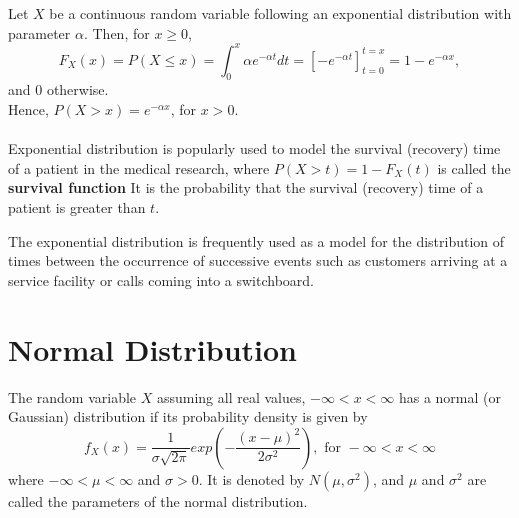 \begin{note}
\end{note}
Let $X$ be a continuous random variable following an exponential distribution with parameter $\alpha$. Then, for $x \geq 0$,
$$
F_X(x) = P(X \leq x) = \int_{0}^{x} \alpha e^{-\alpha t} dt = \left[-e^{-\alpha t}\right]_{t = 0}^{t = x} = 1 - e^{-\alpha x},
$$ and 0 otherwise. \\
Hence, $P(X > x) = e^{-\alpha x}$, for $x > 0$. \\ \hfill \\
Exponential distribution is popularly used to model the survival (recovery) time of a patient in the medical research, where $P(X > t) = 1 - F_X(t)$ is called the \textbf{survival function} It is the probability that the survival (recovery) time of a patient is greater than $t$.
\begin{note}
\end{note}
The exponential distribution is frequently used as a model for the distribution of times between the occurrence of successive events such as customers arriving at a service facility or calls coming into a switchboard.

\section{Normal Distribution}
\begin{definition}
The random variable $X$ assuming all real values, $-\infty < x < \infty$ has a normal (or Gaussian) distribution if its probability density is given by
$$
f_X(x) = \dfrac{1}{\sigma \sqrt{2\pi}} exp\left( - \dfrac{(x-\mu)^2}{2\sigma^2}\right), \text{ for } -\infty < x < \infty
$$ where $-\infty < \mu < \infty $ and $\sigma > 0$.
It is denoted by $N(\mu, \sigma^2)$, and $\mu$ and $\sigma^2$ are called the parameters of the normal distribution.
\end{definition}

